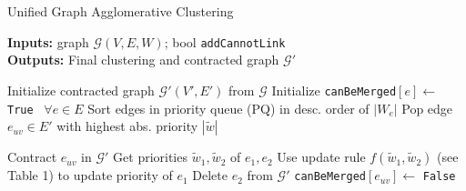 \begin{algorithm}
  \caption{Unified Graph Agglomerative Clustering}
   \hspace*{\algorithmicindent} \textbf{Inputs:} graph $\mathcal{G}(V,E,W)$; bool {\color{blue}\texttt{addCannotLink}}  \\
  \hspace*{\algorithmicindent} \textbf{Outputs:} Final clustering and contracted graph $\mathcal{G}'$\\
  \hspace*{\algorithmicindent} 
  \begin{algorithmic}[1]


      \State Initialize contracted graph $\mathcal{G}'(V',E')$ from $\mathcal{G}$
      \State Initialize \texttt{canBeMerged}$[e] \gets$ \texttt{True} $\,\,\, \forall e\in E$
      \State Sort edges in priority queue (PQ) in desc. order of $|W_e|$ 
      \State
        \State Pop edge $e_{uv}\in E'$ with highest abs. priority $|\tilde{w}|$
        \State
          
          
          \State Contract $e_{uv}$ in $\mathcal{G}'$
            \State Get priorities $\tilde{w}_1, \tilde{w}_2$ of $e_1,e_2$
            \State Use update rule $f(\tilde{w}_1,\tilde{w}_2)$ (see Table 1) to 
            \Statex \hspace{\algorithmicindent}\hspace{\algorithmicindent}\hspace{\algorithmicindent}\hspace{\algorithmicindent} update priority of $e_1$
            \State Delete $e_2$ from $\mathcal{G}'$
          \EndFor
        \EndIf
        \State
          \State \texttt{canBeMerged}$[e_{uv}] \gets$ \texttt{False}
        \EndIf
      \EndWhile



\end{algorithmic}
\end{algorithm}
